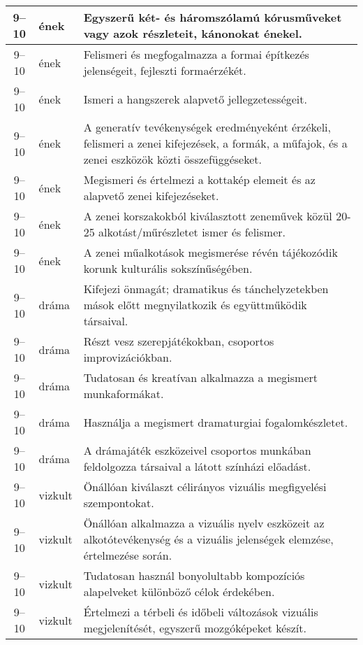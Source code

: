\begin{small}
\begin{longtable}{c | p{2cm} |  p{11cm} }
              9--10 & ének & Egyszerű két- és háromszólamú kórusműveket vagy azok részleteit, kánonokat énekel. \\ \hline
              9--10 & ének & Felismeri és megfogalmazza a formai építkezés jelenségeit, fejleszti formaérzékét. \\ \hline
              9--10 & ének & Ismeri a hangszerek alapvető jellegzetességeit. \\ \hline
              9--10 & ének & A generatív tevékenységek eredményeként érzékeli, felismeri a zenei kifejezések, a formák, a műfajok, és a zenei eszközök közti összefüggéseket. \\ \hline
              9--10 & ének & Megismeri és értelmezi a kottakép elemeit és az alapvető zenei kifejezéseket. \\ \hline
              9--10 & ének & A zenei korszakokból kiválasztott zeneművek közül 20-25 alkotást/műrészletet ismer és felismer. \\ \hline
              9--10 & ének & A zenei műalkotások megismerése révén tájékozódik korunk kulturális sokszínűségében. \\ \hline
              9--10 & dráma & Kifejezi önmagát; dramatikus és tánchelyzetekben mások előtt megnyilatkozik és együttműködik társaival. \\ \hline
              9--10 & dráma & Részt vesz szerepjátékokban, csoportos improvizációkban. \\ \hline
              9--10 & dráma & Tudatosan és kreatívan alkalmazza a megismert munkaformákat. \\ \hline
              9--10 & dráma & Használja a megismert dramaturgiai fogalomkészletet. \\ \hline
              9--10 & dráma & A drámajáték eszközeivel csoportos munkában feldolgozza társaival a látott színházi előadást. \\ \hline
              9--10 & vizkult & Önállóan kiválaszt célirányos vizuális megfigyelési szempontokat. \\ \hline
              9--10 & vizkult & Önállóan alkalmazza a vizuális nyelv eszközeit az alkotótevékenység és a vizuális jelenségek elemzése, értelmezése során. \\ \hline
              9--10 & vizkult & Tudatosan használ bonyolultabb kompozíciós alapelveket különböző célok érdekében. \\ \hline
              9--10 & vizkult & Értelmezi a térbeli és időbeli változások vizuális megjelenítését, egyszerű mozgóképeket készít. \\ \hline

\end{longtable}
\end{small}
